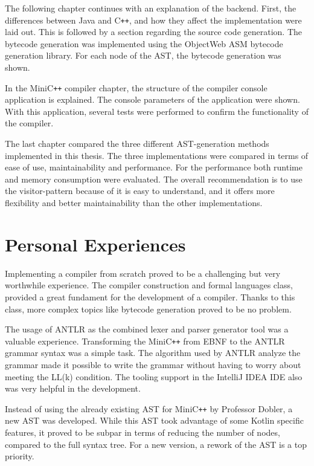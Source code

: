 The following chapter continues with an explanation of the backend. First, the differences between Java and C\verb|++|, and how they affect the implementation were laid out. This is followed by a section regarding the source code generation. The bytecode generation was implemented using the ObjectWeb ASM bytecode generation library. For each node of the AST, the bytecode generation was shown.  

In the MiniC\verb|++| compiler chapter, the structure of the compiler console application is explained. The console parameters of the application were shown. With this application, several tests were performed to confirm the functionality of the compiler. 

The last chapter compared the three different AST-generation methods implemented in this thesis. The three implementations were compared in terms of ease of use, maintainability and performance. For the performance both runtime and memory consumption were evaluated. The overall recommendation is to use the visitor-pattern because of it is easy to understand, and it offers more flexibility and better maintainability than the other implementations.

\section{Personal Experiences}

Implementing a compiler from scratch proved to be a challenging but very worthwhile experience. The compiler construction and formal languages class, provided a great fundament for the development of a compiler. Thanks to this class, more complex topics like bytecode generation proved to be no problem. 

The usage of ANTLR as the combined lexer and parser generator tool was a valuable experience. Transforming the MiniC\verb|++| from EBNF to the ANTLR grammar syntax was a simple task. The algorithm used by ANTLR analyze the grammar made it possible to write the grammar without having to worry about meeting the LL(k) condition. The tooling support in the IntelliJ IDEA IDE also was very helpful in the development. 

Instead of using the already existing AST for MiniC\verb|++| by Professor Dobler, a new AST was developed. While this AST took advantage of some Kotlin specific features, it proved to be subpar in terms of reducing the number of nodes, compared to the full syntax tree. For a new version, a rework of the AST is a top priority.

